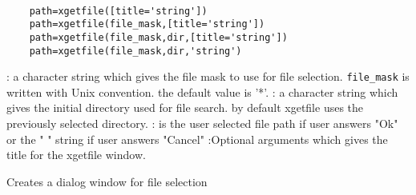 
\begin{mandesc}
  \\ %
\end{mandesc}
\label{xgetfile}
\begin{calling_sequence}
  \begin{verbatim}
    path=xgetfile([title='string'])  
    path=xgetfile(file_mask,[title='string'])  
    path=xgetfile(file_mask,dir,[title='string'])  
    path=xgetfile(file_mask,dir,'string')  
  \end{verbatim}
\end{calling_sequence}
\begin{parameters}
  \begin{varlist}
     : a character string which gives the file mask to use for file selection. \verb!file_mask! is written with Unix convention. the default value is '*'.
     : a character string which gives the initial directory used for file search. by default xgetfile uses the previously selected directory.
     : is the user selected file path if user answers "Ok" or the " " string if user answers "Cancel"
     :Optional arguments which gives the title for the xgetfile window.
  \end{varlist}
\end{parameters}
\begin{mandescription}
  Creates a dialog window for file selection
\end{mandescription}
\begin{examples}
  \begin{program}
  \end{program}
\end{examples}
\begin{manseealso}
         
\end{manseealso}

